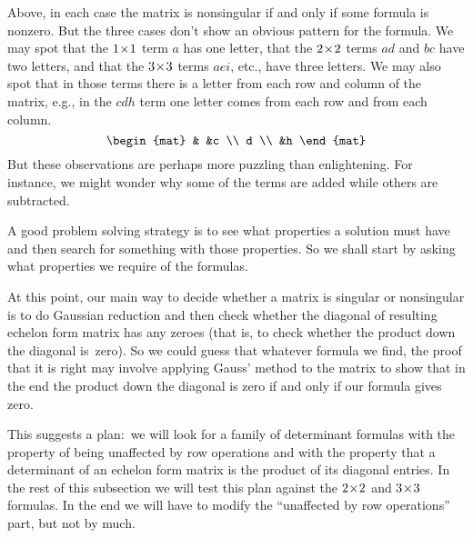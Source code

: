 Above, in each case the matrix is nonsingular if and only 
if some formula is nonzero.
But the three cases don't 
show an obvious pattern for the formula. 
We may spot that the \(1 \! \times \! 1\) term
\( a \) has one letter, that the \(2 \! \times \! 2\) terms
\(ad\) and \(bc\) have two letters, and that the \(3 \! \times \! 3\)
terms \(aei\), etc., have three letters.
We may also spot that in those terms
there is a letter from each row and column of the matrix, e.g., 
in the \(cdh\) term one letter 
comes from each row and from each column.
\begin{equation*}
   \begin{mat}
          &    &c \\
      d           \\
          &h
   \end{mat} 
\end{equation*}
But these observations are perhaps more puzzling than
enlightening.
For instance, we might wonder why 
some of the terms are added while others are subtracted.

A good problem solving strategy is to
see what properties a solution must have and
then search for something with those properties.
So we shall start by asking what properties we require of the formulas.

At this point, our
main way to decide whether a matrix is singular or nonsingular
is to do Gaussian 
reduction and then check whether 
the diagonal of resulting echelon form matrix has any zeroes
(that is, to check whether the product down the diagonal is~zero).
So we could guess that whatever formula we find, the proof that 
it is right may involve applying Gauss' method to the matrix
to show that in the end the product down the diagonal is zero if and only if
our formula gives zero. 

This suggests a plan:~we will look for a family of determinant
formulas with the property of being
unaffected by row operations and with the property that a determinant of an
echelon form matrix is the product of its diagonal entries.
In the rest of this subsection we will test this plan against the 
$2 \! \times \! 2$ and $3 \! \times \! 3$ formulas.
In the end we will have to modify the ``unaffected by row operations'' 
part, but not by much.

